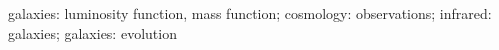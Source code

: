 \begin{keywords}
galaxies: luminosity function, mass function; cosmology: observations; infrared: galaxies; galaxies: evolution
\end{keywords}

\maketitle

